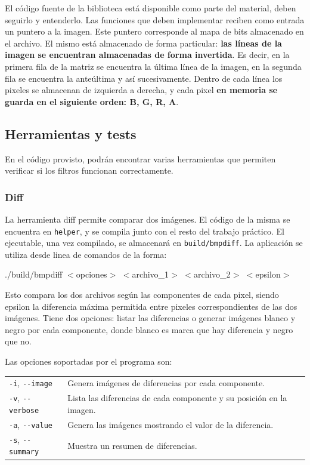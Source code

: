 \documentclass[a4paper, 12pt]{article}
\newcommand{\code}[1]{{\sffamily #1}\xspace}
\newenvironment{codesnippet}{%
	\begin{Sbox}\begin{minipage}{\textwidth}\sffamily\small}%
	{\end{minipage}\end{Sbox}%
		\begin{center}%
		\vspace{-0.4cm}\colorbox{litegrey}{\TheSbox}\end{center}\vspace{0.3cm}}
\begin{document}
El código fuente de la biblioteca está disponible como parte del material, deben seguirlo y entenderlo.
Las funciones que deben implementar reciben como entrada un puntero a la imagen. Este puntero corresponde al mapa de bits almacenado en el archivo.
El mismo está almacenado de forma particular: \textbf{las líneas de la imagen se encuentran almacenadas de forma invertida}.
Es decir, en la primera fila de la matriz se encuentra la última línea de la imagen, en la segunda fila se encuentra la anteúltima y así sucesivamente.
Dentro de cada línea los pixeles se almacenan de izquierda a derecha, y cada pixel \textbf{en memoria se guarda en el siguiente orden: B, G, R, A}.




\subsection{Herramientas y tests}

En el código provisto, podrán encontrar varias herramientas
que permiten verificar si los filtros funcionan correctamente.

\subsubsection*{Diff}
La herramienta \code{diff} permite comparar dos imágenes.
El código de la misma se encuentra en \texttt{helper}, y se
compila junto con el resto del trabajo práctico.
El ejecutable, una vez compilado, se almacenará en
\texttt{build/bmpdiff}.
La aplicación se utiliza desde linea de comandos de la forma:

\begin{codesnippet}
./build/bmpdiff $<$opciones$>$ $<$archivo_1$>$ $<$archivo_2$>$ $<$epsilon$>$
\end{codesnippet}


Esto compara los dos archivos según las componentes de cada pixel, siendo epsilon la diferencia máxima permitida entre pixeles correspondientes de las dos imágenes.
Tiene dos opciones: listar las diferencias o generar imágenes blanco y negro por cada componente, donde blanco es marca que hay diferencia y negro que no.

\bigskip
Las opciones soportadas por el programa son:

\begin{tabular}{l|l}
  \verb|-i|, \verb|--image|    &  Genera imágenes de diferencias por cada componente.\\
  \verb|-v|, \verb|--verbose|  &  Lista las diferencias de cada componente y su posición en la imagen.\\
  \verb|-a|, \verb|--value|    &  Genera las imágenes mostrando el valor de la diferencia.\\
  \verb|-s|, \verb|--summary|  &  Muestra un resumen de diferencias.\\
\end{tabular}
\end{document}
